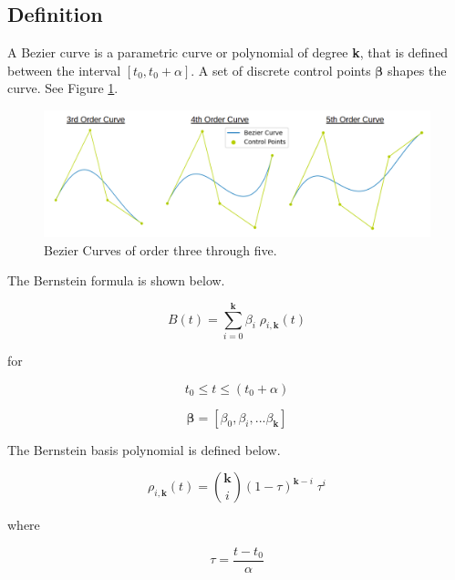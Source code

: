 \documentclass{article}
\begin{document}
\subsection{Definition}

A Bezier curve is a parametric curve or polynomial of degree \textbf{k}, that is defined between the interval \([t_0, t_0 + \alpha]\). A set of discrete control points \(\boldsymbol{\beta}\) shapes the curve. See Figure \ref{Fig:BezierCurves}.

\begin{figure}[H]
\begin{center}
\includegraphics[scale=.3]{BezierCurves.png}
\end{center}
\caption{Bezier Curves of order three through five.}
\label{Fig:BezierCurves}
\end{figure}

The Bernstein formula is shown below.

\begin{equation}
    B(t) = \sum_{i=0}^{\textbf{k}}\beta_i \;\rho_{i,\textbf{k}}(t)
\end{equation}

for

\begin{equation}
    t_0 \leq t \leq (t_0 + \alpha)
\end{equation}

\begin{equation}
    \boldsymbol{\beta} = [\beta_0, \beta_i, ... \beta_{\textbf{k}}]
\end{equation}

\hspace{1cm}

The Bernstein basis polynomial is defined below.

\begin{equation}
    \rho_{i,\textbf{k}}(t) = \binom{\textbf{k}}{i}(1 - \tau)^{\textbf{k}-i}\;\tau^i
\end{equation}

where

\begin{equation}
    \tau = \frac{t-t_0}{\alpha}
\end{equation}
\end{document}
